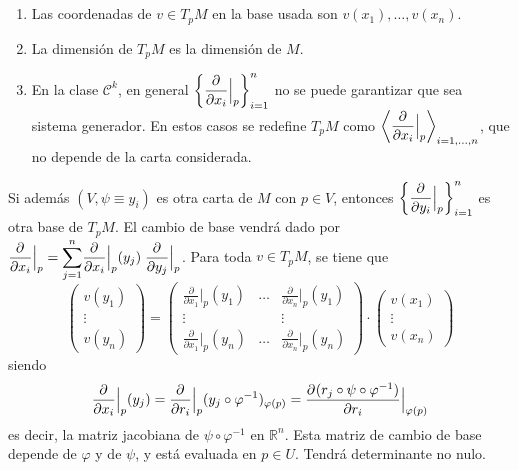 \, 
\begin{obs} \,
\begin{enumerate}
    \item Las coordenadas de $v \in T_pM$ en la base usada son $v(x_1),\dots,v(x_n)$.
    \item La dimensión de $T_pM$ es la dimensión de $M$.
    \item En la clase $\mathcal{C}^k$, en general $\left\{{\dfrac{\partial^{} }{\partial x_i}}{\Big|_p}\right\}_{i=1}^n$ no se puede garantizar que sea sistema generador. En estos casos se redefine $T_pM$ como $\left\langle{\dfrac{\partial^{} }{\partial x_i}} {\Big|_p}\right\rangle_{i=1,\dots,n}$, que no depende de la carta considerada.
\end{enumerate}
\end{obs}
Si además $(V,\psi\equiv y_i)$ es otra carta de $M$ con $p \in V$, entonces $\left\{{\dfrac{\partial^{} }{\partial y_i}}{\Big|_p}\right\}_{i=1}^n$ es otra base de $T_pM$. El cambio de base vendrá dado por $\pd{}{ x_i}{\Big|_p} = \mathlarger{\sum}_{j=1}^n \pd{}{x_i}{\Big|_p}(y_j)\; \pd{}{y_j}{\Big|_p}$.
Para toda $v \in T_pM$, se tiene que
$$\left(\begin{array}{c}
    v(y_1) \\
    \vdots \\
    v(y_n)
\end{array}\right) = \left(\begin{array}{ccc}
    \frac{\partial}{\partial x_1}{\Big|_p}(y_1) & \dots &  \frac{\partial}{\partial x_n}{\Big|_p}(y_1)\\
    \vdots &  & \vdots\\
    \frac{\partial}{\partial x_1}{\Big|_p}(y_n) & \dots & \frac{\partial}{\partial x_n}{\Big|_p}(y_n)
\end{array}\right) \cdot \left(\begin{array}{c}
    v(x_1) \\
    \vdots \\
    v(x_n)
\end{array}\right)  $$
siendo $$\dfrac{\partial^{} }{\partial x_i} \Big|_p (y_j) = \dfrac{\partial^{} }{\partial r_i} \Big|_p (y_j \circ \varphi^{-1})_{\varphi(p)} = \dfrac{\partial^{} (r_j \circ \psi \circ \varphi^{-1})}{\partial r_i} \Big|_{\varphi(p)}$$
es decir, la matriz jacobiana de $\psi \circ \varphi^{-1}$ en $\mathbb R^n$. Esta matriz de cambio de base depende de $\varphi$ y de $\psi$, y está evaluada en $p\in U$. Tendrá determinante no nulo.

